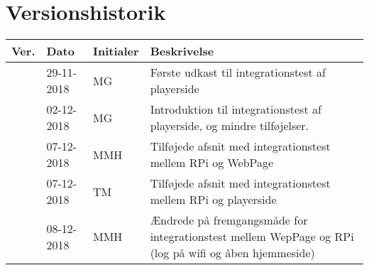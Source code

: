 \documentclass[Integrationstest/Integrationstest_main.tex]{subfiles}
\begin{document}
\section{Versionshistorik}
\begin{longtable}{|L{0.07\textwidth}|L{0.15\textwidth}|L{0.13\textwidth}|L{0.55\textwidth}|}
        \hline
        \textbf{Ver.} & \textbf{Dato} & \textbf{Initialer} & \textbf{Beskrivelse}  \\ \hline
        & 29-11-2018 & MG & Første udkast til integrationstest af playerside \\ \hline
        & 02-12-2018 & MG & Introduktion til integrationstest af playerside, og mindre tilføjelser. \\ \hline 
        & 07-12-2018 & MMH & Tilføjede afsnit med integrationstest mellem RPi og WebPage \\ \hline
        & 07-12-2018 & TM & Tilføjede afsnit med integrationstest mellem RPi og playerside \\ \hline
        & 08-12-2018 & MMH & Ændrede på fremgangsmåde for integrationstest mellem WepPage og RPi (log på wifi og åben hjemmeside) \\ \hline
\end{longtable}
\end{document}
